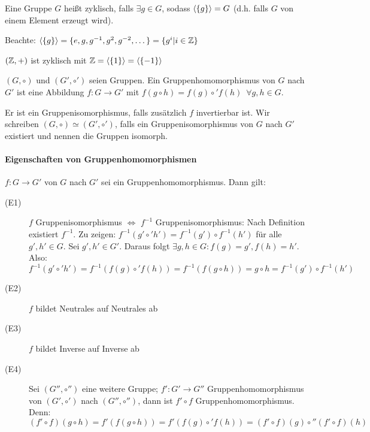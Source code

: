 \documentclass[12pt,a4paper]{scrartcl}
\begin{document}
\begin{defi}
	Eine Gruppe $G$ heißt zyklisch, falls $\exists g\in G$, sodass $\langle\{g\}\rangle = G$ (d.h. falls $G$ von einem Element erzeugt wird).
\end{defi}

\noindent Beachte: $\langle\{g\}\rangle = \{e, g, g^{-1}, g^2, g^{-2},\dots\} = \{g^i|i\in\mathbb Z\}$

\begin{bsp}

 $(\mathbb Z,+)$ ist zyklisch mit $\mathbb Z =\langle\left\lbrace 1 \right\rbrace \rangle = \langle\left\lbrace -1 \right\rbrace \rangle$

\end{bsp}

\begin{defi}
	$(G,\circ)$ und $(G',\circ')$ seien Gruppen. Ein Gruppenhomomorphismus von $G$ nach $G'$ ist eine Abbildung $f\colon G\to G'$ mit $f(g\circ h) = f(g)\circ'f(h)\enspace \forall g, h\in G$.
	
	Er ist ein Gruppenisomorphismus, falls zusätzlich $f$ invertierbar ist. Wir schreiben $(G,\circ)\simeq (G',\circ')$, falls ein Gruppenisomorphismus von $G$ nach $G'$ existiert und nennen die Gruppen isomorph.
\end{defi}

\paragraph{Eigenschaften von Gruppenhomomorphismen} $f\colon G\to G'$ von $G$ nach $G'$ sei ein Gruppenhomomorphismus. Dann gilt:
\begin{description}
	\item[(E1)] $f$ Gruppenisomorphismus $\Leftrightarrow$ $f^{-1}$ Gruppenisomorphismus: Nach Definition existiert $f^{-1}$. Zu zeigen: $f^{-1}(g'\circ' h')= f^{-1}(g')\circ f^{-1}(h')$ für alle $g',h'\in G$. Sei $g', h' \in G' $. Daraus folgt $ \exists g, h\in G : f(g) = g', f(h) = h'$. Also:
	\begin{equation*}
		f^{-1}(g'\circ'h')= f^{-1}(f(g)\circ'f(h)) = f^{-1}(f(g\circ h))= g\circ h  = f^{-1}(g')\circ f^{-1}(h')
	\end{equation*} 
	
	\item[(E2)] $f$ bildet Neutrales auf Neutrales ab
	
	\item[(E3)] $f$ bildet Inverse auf Inverse ab
	\item[(E4)] Sei $(G'',\circ'')$ eine weitere Gruppe; $f'\colon G'\to G''$ Gruppenhomomorphismus von $(G',\circ')$ nach $(G'',\circ'')$, dann ist $f'\circ f$ Gruppenhomomorphismus. Denn: 
	\begin{equation*}
		(f'\circ f)(g\circ h) = f'(f(g\circ h)) = f'(f(g)\circ'f(h)) = (f'\circ f)(g)\circ''(f'\circ f)(h)
	\end{equation*}
\end{description}
\end{document}

